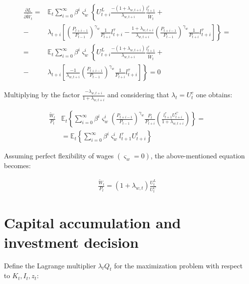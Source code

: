 \documentclass{pracamgr}
\numberwithin{equation}{section}
\begin{document}
\begin{align}
\frac{\partial L}{\partial \widetilde{W}_{t}} = &\mathbb{E}_{t} \sum\limits_{i=0}^{\infty} \beta^{i} \varsigma_{w}^{i}  \left\{ U_{t+i}^{L} {\frac{-(1+\lambda_{w,t+i})}{\lambda_{w,t+i}}} \frac{l_{t+1}^{\tau}}{\widetilde{W}_{t}}  \right. + \nonumber \\ 
- &\lambda_{t+i} \left. \left[ \left( \frac{P_{t+i-1}}{P_{t-1}} \right)^{\gamma_{w}} \frac{1}{P_{t+i}} l_{t+i}^{\tau} - {\frac{1+\lambda_{w,t+i}}{\lambda_{w,t+i}}} \left( \frac{P_{t+i-1}}{P_{t-1}} \right)^{\gamma_{w}} \frac{1}{P_{t+i}} l_{t+i}^{\tau} \right] \right\} = \nonumber \\ 
= &\mathbb{E}_{t} \sum\limits_{i=0}^{\infty} \beta^{i} \varsigma_{w}^{i}  \left\{ U_{t+i}^{L} {\frac{-(1+\lambda_{w,t+i})}{\lambda_{w,t+i}}} \frac{l_{t+1}^{\tau}}{\widetilde{W}_{t}}  \right. + \nonumber \\ 
- &\lambda_{t+i} \left. \left[ {\frac{-1}{\lambda_{w,t+i}}} \left( \frac{P_{t+i-1}}{P_{t-1}} \right)^{\gamma_{w}} \frac{1}{P_{t+i}} l_{t+i}^{\tau} \right] \right\} = 0
\end{align}

Multiplying by the factor $\frac{-\lambda_{w,t+i}}{1+\lambda_{w,t+i}}$ and considering that $\lambda_{t} = U_{t}^{c}$ one obtains:

\begin{align}
\frac{\widetilde{W}_{t}}{P_{t}} &\mathbb{E}_{t} \left\{ \sum\limits_{i=0}^{\infty} \beta^{i} \varsigma_{w}^{i} \left( \frac{P_{t+i-1}}{P_{t-1}} \right)^{\gamma_{w}}  \frac{P_{t}}{P_{t+i}} \left( \frac{l_{t+1}^{\tau} U_{t+i}^{C}}{1 + \lambda_{w, t+i}} \right) \right\} = \nonumber \\
&= \mathbb{E}_{t} 
\left\{ \sum\limits_{i=0}^{\infty} \beta^{i} \varsigma_{w}^{i} l_{t+1}^{\tau} U_{t+i}^{l} \right\}
\end{align}

Assuming perfect flexibility of wages $(\varsigma_{w} = 0)$, the above-mentioned equation becomes:

\begin{align}
\frac{\widetilde{W}_{t}}{P_{t}} = \left(1 + \lambda_{w, t} \right)\frac{U_{t}^{L}}{U_{t}^{C}}
\end{align}

\section*{Capital accumulation and investment decision}

Define the Lagrange multiplier $\lambda_{t} Q_{t}$ for the maximization problem with respect to $K_{t}, I_{t}, z_{t}$:
\end{document}
